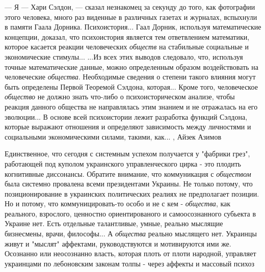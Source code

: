 
— Я — Хари Сэлдон, — сказал незнакомец за секунду до того, как фотографии этого
человека, много раз виденные в различных газетах и журналах, вспыхнули в памяти
Гаала Дорника.  Психоистория... Гаал Дорник, используя математические
концепции, доказал, что психоистория является тем ответвлением математики,
которое касается реакции человеческих \emph{обществ} на стабильные социальные и
экономические стимулы... ...Из всех этих выводов следовало, что, используя точные
математические данные, можно определенным образом воздействовать на
человеческие \emph{общества}. Необходимые сведения о степени такого влияния могут быть
определены Первой Теоремой Сэлдона, которая... Кроме того, человеческое \emph{общество}
не должно знать что-либо о психоисторическом анализе, чтобы реакция данного
общества не направлялась этим знанием и не отражалась на его эволюции...  В
основе всей психоистории лежит разработка функций Сэлдона, которые выражают
отношения и определяют зависимость между личностями и социальными
экономическими силами, такими, как...
, Айзек Азимов

Единственное, что сегодня с системным успехом получается у "фабрики грез",
работающей под куполом украинского управленческого цирка - это плодить
когнитивные диссонансы.  Обратите внимание, что коммуникация с \emph{обществом} была
системно провалена всеми президентами Украины. Не только потому, что
позиционирование в украинских политических реалиях не предполагает позиции. Но
и потому, что коммуницировать-то особо и не с кем - \emph{общества}, как реального,
взрослого, ценностно ориентированого и самоосознанного субьекта в Украине нет.
Есть отдельные талантливые, умные, реально мыслящие бизнесмены, врачи,
философы... А \emph{общества} реально мыслящего нет.  Украинцы живут и "мыслят"
аффектами, руководствуются и мотивируются ими же.  Осознанно или неосознанно
власть, которая плоть от плоти народной, управляет украинцами по лебоновским
законам толпы - через аффекты и массовый психоз
  
